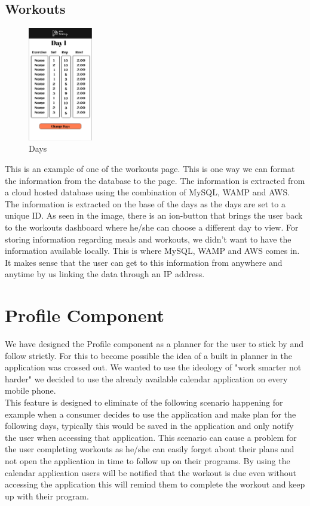 \documentclass[a4paper,12pt]{report}
\begin{document}
\subsection{Workouts}
\begin{figure}
\centering
\includegraphics[width=0.25\textwidth]{images/dayWorkouts.png}
\caption{\label{fig:homepage}Days}
\end{figure}
This is an example of one of the workouts page. This is one way we can format the information from the database to the page. The information is extracted from a cloud hosted database using the combination of MySQL, WAMP and AWS. The information is extracted on the base of the days as the days are set to a unique ID. As seen in the image, there is an ion-button that brings the user back to the workouts dashboard where he/she can choose a different day to view.
For storing information regarding meals and workouts, we didn’t want to have the information available locally. This is where MySQL, WAMP and AWS comes in. It makes sense that the user can get to this information from anywhere and anytime by us linking the data through an IP address.

\newpage
\section{Profile Component}
We have designed the Profile component as a planner for the user to stick by and follow strictly.
For this to become possible the idea of a built in planner in the application was crossed out.
We wanted to use the ideology of "work smarter not harder" we decided to use the already available calendar application on every mobile phone.\\
This feature is designed to eliminate of the following scenario happening for example when a consumer decides to use the application and make plan for the following days, typically this would be saved in the application and only notify the user when accessing that application. This scenario can cause a problem for the user completing workouts as he/she can easily forget about their plans and not open the application in time to follow up on their programs.
By using the calendar application users will be notified that the workout is due even without accessing the application this will remind them to complete the workout and keep up with their program.
\end{document}
